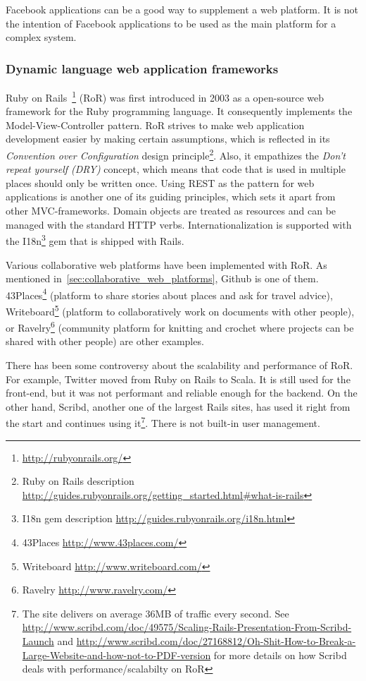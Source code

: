 Facebook applications can be a good way to supplement a web platform. It is not the intention of Facebook applications to be used as the main platform for a complex system.

\subsubsection{Dynamic language web application frameworks}
Ruby on Rails~\footnote{\url{http://rubyonrails.org/}} (RoR) was first introduced in 2003 as a open-source web framework for the Ruby programming language. It consequently implements the Model-View-Controller pattern. 
RoR strives to make web application development easier by making certain assumptions, which is reflected in its \textit{Convention over Configuration} design principle\footnote{Ruby on Rails description \url{http://guides.rubyonrails.org/getting_started.html#what-is-rails}}. Also, it empathizes the \textit{Don't repeat yourself (DRY)} concept, which means that code that is used in multiple places should only be written once. 
Using REST as the pattern for web applications is another one of its guiding principles, which sets it apart from other MVC-frameworks. Domain objects are treated as resources and can be managed with the standard HTTP verbs. Internationalization is supported with the I18n\footnote{I18n gem description \url{http://guides.rubyonrails.org/i18n.html}} gem that is shipped with Rails.

Various collaborative web platforms have been implemented with RoR. As mentioned in~\ref{sec:collaborative_web_platforms}, Github is one of them. 43Places\footnote{43Places \url{http://www.43places.com/}} (platform to share stories about places and ask for travel advice), Writeboard\footnote{Writeboard \url{http://www.writeboard.com/}} (platform to collaboratively work on documents with other people), or Ravelry\footnote{Ravelry \url{http://www.ravelry.com/}} (community platform for knitting and crochet where projects can be shared with other people) are other examples.

There has been some controversy about the scalability and performance of RoR. For example, Twitter moved from Ruby on Rails to Scala. It is still used for the front-end, but it was not performant and reliable enough for the backend\cite{twitter_ruby_scala}. On the other hand, Scribd, another one of the largest Rails sites, has used it right from the start and continues using it\footnote{The site delivers on average 36MB of traffic every second. See \url{http://www.scribd.com/doc/49575/Scaling-Rails-Presentation-From-Scribd-Launch} and \url{http://www.scribd.com/doc/27168812/Oh-Shit-How-to-Break-a-Large-Website-and-how-not-to-PDF-version} for more details on how Scribd deals with performance/scalabilty on RoR}.
There is not built-in user management.


